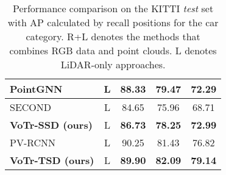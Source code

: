 \documentclass[10pt,twocolumn,letterpaper]{article}
\begin{document}
\begin{table}[]
{\begin{tabular}{|l|c| c c c|}
PointGNN~\cite{pointgnn}    & L                     & 88.33  & 79.47  & 72.29  \\
\midrule
SECOND~\cite{yan2018second}     & L                 & 84.65  & 75.96  & 68.71  \\
\textbf{VoTr-SSD (ours)}    & L         & \textbf{86.73} & \textbf{78.25} & \textbf{72.99}  \\
\midrule
PV-RCNN~\cite{shi2020pv}        & L                 & 90.25  & 81.43  & 76.82  \\
\textbf{VoTr-TSD (ours)}      & L & \textbf{89.90}  & \textbf{82.09}  & \textbf{79.14} \\ 
\bottomrule
\end{tabular}}
\setlength{\belowcaptionskip}{10pt}
\caption{Performance comparison on the KITTI \textit{test} set with AP calculated by  recall positions for the car category. R+L denotes the methods that combines RGB data and point clouds. L denotes LiDAR-only approaches.} \label{table_kitti_1}
\vspace{-5mm}
\end{table}
\end{document}
